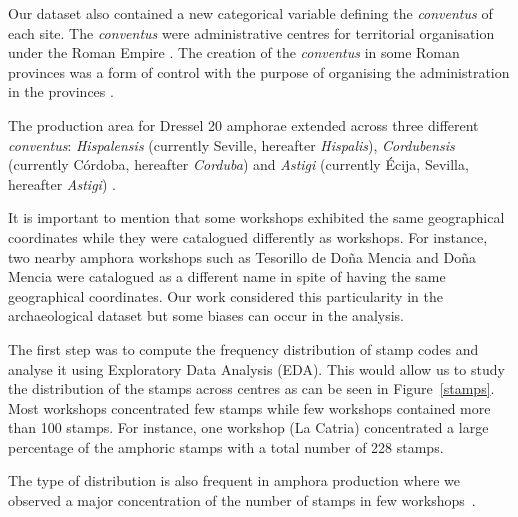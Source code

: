 Our dataset also contained a new categorical variable defining the \textit{conventus} of each site. The \textit{conventus} were administrative centres for territorial organisation under the Roman Empire \citep[58]{ozcariz_gil_administracion_2013}.
The creation of the \textit{conventus} in some Roman provinces was a form of control with the purpose of organising the administration in the provinces \citep{albertini_les_1923}.


The production area for Dressel 20 amphorae extended across three different \textit{conventus}: \textit{Hispalensis} (currently Seville, hereafter \textit{Hispalis}), \textit{Cordubensis} (currently C\'ordoba, hereafter \textit{Corduba}) and \textit{Astigi} (currently \'Ecija, Sevilla, hereafter \textit{Astigi}) \citep{rodriguez_economioleicola_1977,chicdatos2001,berni_millet_epigrafianforica_2008} . 


It is important to mention that some workshops exhibited the same geographical coordinates while they were catalogued differently as workshops. For instance, two nearby amphora workshops such as Tesorillo de Do\~na Mencia and Do\~na Mencia were catalogued as a different name in spite of having the same geographical coordinates. Our work considered this particularity in the archaeological dataset but some biases can occur in the analysis. 

The first step was to compute the frequency distribution of stamp codes and analyse it using Exploratory Data Analysis (EDA). This would allow us to study the distribution of the stamps across centres as can be seen in Figure~\ref{stamps}. Most workshops concentrated few stamps while few workshops contained more than 100 stamps. For instance, one workshop (La Catria) concentrated a large percentage of the amphoric stamps with a total number of 228 stamps.

The type of distribution is also frequent in amphora production where we observed a major concentration of the number of stamps in few workshops~\citep{bayesian_2018,coto-sarmiento_identifying_2018}.


